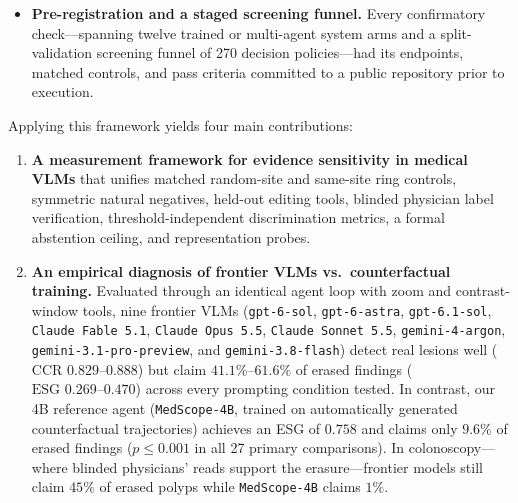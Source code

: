 \documentclass[5p,times,twocolumn,authoryear]{elsarticle}
\begin{document}
\begin{itemize}[leftmargin=*,nosep]
    \item \textbf{Pre-registration and a staged screening funnel.} Every confirmatory check---spanning twelve trained or multi-agent system arms and a split-validation screening funnel of 270 decision policies---had its endpoints, matched controls, and pass criteria committed to a public repository prior to execution.
\end{itemize}

Applying this framework yields four main contributions:
\begin{enumerate}[leftmargin=*,nosep]
    \item \textbf{A measurement framework for evidence sensitivity in medical VLMs} that unifies matched random-site and same-site ring controls, symmetric natural negatives, held-out editing tools, blinded physician label verification, threshold-independent discrimination metrics, a formal abstention ceiling, and representation probes.
    \item \textbf{An empirical diagnosis of frontier VLMs vs.\ counterfactual training.} Evaluated through an identical agent loop with zoom and contrast-window tools, nine frontier VLMs (\texttt{gpt-6-sol}, \texttt{gpt-6-astra}, \texttt{gpt-6.1-sol}, \texttt{Claude Fable 5.1}, \texttt{Claude Opus 5.5}, \texttt{Claude Sonnet 5.5}, \texttt{gemini-4-argon}, \texttt{gemini-3.1-pro-preview}, and \texttt{gemini-3.8-flash}) detect real lesions well ($\text{CCR } 0.829\text{--}0.888$) but claim $41.1\%\text{--}61.6\%$ of erased findings ($\text{ESG } 0.269\text{--}0.470$) across every prompting condition tested. In contrast, our 4B reference agent (\texttt{MedScope-4B}, trained on automatically generated counterfactual trajectories) achieves an ESG of $0.758$ and claims only $9.6\%$ of erased findings ($p \le 0.001$ in all 27 primary comparisons). In colonoscopy---where blinded physicians' reads support the erasure---frontier models still claim $45\%$ of erased polyps while \texttt{MedScope-4B} claims $1\%$.

\end{enumerate}
\end{document}

